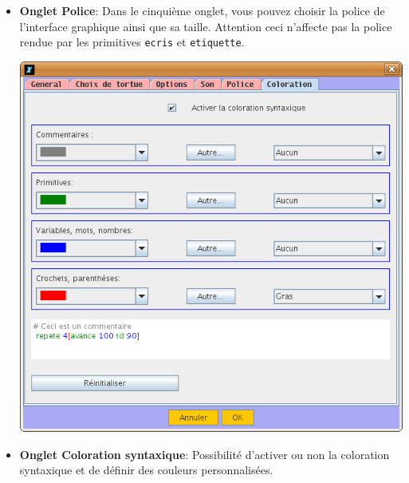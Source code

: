 \begin{itemize}
\begin{itemize}
\begin{center}
	\end{center}
	\vspace{0.25cm}
	\item \textbf{Onglet Police}: Dans le cinquième onglet, vous pouvez choisir la police de l'interface graphique ainsi que sa taille. Attention ceci n'affecte pas la police rendue par les primitives \texttt{ecris} et \texttt{etiquette}.
	\begin{center}
 		\includegraphics[scale=0.4]{images/CapturePref6.png}
	\end{center}
	\vspace{0.25cm}
	\item \textbf{Onglet Coloration syntaxique}: Possibilité d'activer ou non la coloration syntaxique et de définir des couleurs personnalisées.
\end{itemize}
\end{itemize}
